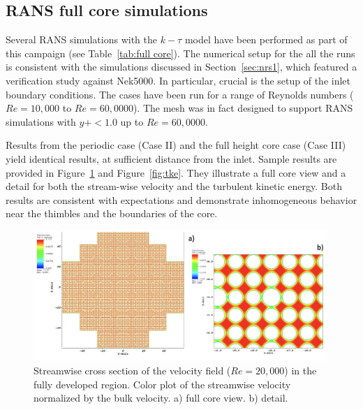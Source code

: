 \subsection{RANS full core simulations}
\label{sec:results2}

Several RANS simulations with the $k-\tau$ model have been performed as part of this campaign (see Table~\ref{tab:full core}). The numerical setup for the all the runs is consistent with the simulations discussed in Section~\ref{sec:nrs1}, which featured a verification study against Nek5000. In particular, crucial is the setup of the inlet boundary conditions. The cases have been run for a range of Reynolds numbers ($Re=10,000$ to $Re=60,0000$). The mesh was in fact  designed to support RANS simulations with $y+<1.0$ up to $Re=60,0000$.

Results from the periodic case (Case II) and the full height core case (Case III) yield identical results, at sufficient distance from the inlet. Sample results are provided in Figure~\ref{fig:vz} and Figure~\ref{fig:tke}. They illustrate a full core view and a detail for both the stream-wise velocity and the turbulent kinetic energy.  Both results are consistent with expectations and demonstrate inhomogeneous behavior near the thimbles and the boundaries of the core.

\begin{figure}[!ht]
\centering
\includegraphics[width=0.99\textwidth]{./figures/periodic_vz.png}
\caption{Streamwise cross section of the velocity field ($Re=20,000$) in the fully developed region. Color plot of the streamwise velocity normalized by the bulk velocity. a) full core view. b) detail.}
\label{fig:vz}
\end{figure}

